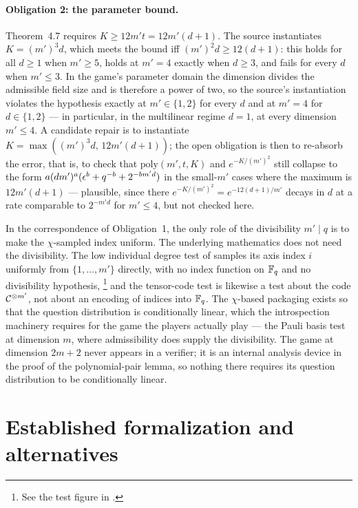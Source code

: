 \documentclass[11pt]{article}
\begin{document}
\paragraph{Obligation 2: the parameter bound.}
Theorem~4.7 requires $K \ge 12 m' t = 12 m' (d+1)$.  The source
instantiates $K = (m')^3 d$, which meets the bound iff
$(m')^2 d \ge 12(d+1)$: this holds for all $d \ge 1$ when $m' \ge 5$,
holds at $m' = 4$ exactly when $d \ge 3$, and fails for every $d$ when
$m' \le 3$.  In the game's parameter domain the dimension divides the
admissible field size and is therefore a power of two, so the source's
instantiation violates the hypothesis exactly at $m' \in \{1,2\}$ for
every $d$ and at $m' = 4$ for $d \in \{1,2\}$ --- in particular, in the
multilinear regime $d = 1$, at every dimension $m' \le 4$.  A candidate
repair is to instantiate $K = \max((m')^3 d,\, 12 m'(d+1))$; the open
obligation is then to re-absorb the error, that is, to check that
$\mathrm{poly}(m',t,K)$ and $e^{-K/(m')^2}$ still collapse to the form
$a(dm')^a(\eps^b + q^{-b} + 2^{-bm'd})$ in the small-$m'$ cases where the
maximum is $12m'(d+1)$ --- plausible, since there
$e^{-K/(m')^2} = e^{-12(d+1)/m'}$ decays in $d$ at a rate comparable to
$2^{-m'd}$ for $m' \le 4$, but not checked here.

In the correspondence of Obligation~1, the only role of the divisibility
$m' \mid q$ is to make the $\chi$-sampled index uniform.  The underlying
mathematics does not need the divisibility.  The low
individual degree test of \cite{Ji2020LowIndividualDegree} samples its axis
index $i$ uniformly from $\{1,\ldots,m'\}$ directly, with no index function
on $\F_q$ and no divisibility hypothesis,%
\footnote{See the test figure in .}
and the tensor-code test is likewise a test about the code
$\mathcal C^{\ot m'}$, not about an encoding of indices into $\F_q$.  The
$\chi$-based packaging exists so that the question distribution is
conditionally linear, which the introspection machinery requires for the
game the players actually play --- the Pauli basis test at dimension $m$,
where admissibility does supply the divisibility.  The game at dimension
$2m+2$ never appears in a verifier; it is an internal analysis device in the
proof of the polynomial-pair lemma, so nothing there requires its question
distribution to be conditionally linear.

\section{Established formalization and alternatives}
\end{document}
